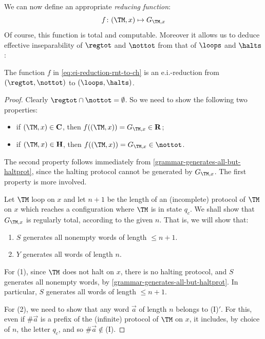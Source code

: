 We can now define an appropriate \emph{reducing function}:
\begin{equation}
\label{eq:ei-reduction-rnt-to-ch}
    f \colon (\TM,x) \mapsto G_{\TM,x}
\end{equation}
Of course, this function is total and computable.
Moreover it allows us to deduce effective inseparability of $\regtot $ and $\nottot$ from that of $\loops$ and $\halts$:



\begin{proposition}
\label{regtot-nottot-reduces-to-loops-halts}
    The function $f$ in \eqref{eq:ei-reduction-rnt-to-ch} is an e.i.-reduction from $(\regtot, \nottot)$ to $(\loops,\halts)$.
\end{proposition}
\begin{proof}
Clearly $\regtot \cap \nottot = \emptyset$. 
So we need to show the following two properties:
\begin{itemize}
\item if $(\TM,x) \in \mathbf{C}$, then $f((\TM,x)) = G_{\TM,x} \in \mathbf{R}$;
\item if $(\TM,x) \in \mathbf{H}$, then $f((\TM,x)) = G_{\TM,x} \in \nottot$.
\end{itemize}

The second property follows immediately from \cref{grammar-generates-all-but-haltprot}, since the halting protocol cannot be generated by $G_{\TM,x}$. The first property is more involved.

Let $\TM$ loop on $x$ and let $n+1$ be the length of an (incomplete) protocol of $\TM$ on $x$ which reaches a configuration where $\TM$ is in state $q_c$. We shall show that $G_{\TM,x}$ is regularly total, according to the given $n$.
That is, we will show that:
\begin{enumerate}
    \item $S$ generates all nonempty words of length $\leq n+1$.
    \item $Y$ generates all words of length $n$.
\end{enumerate}

For (1), since $\TM$ does not halt on $x$, there is no halting protocol, and $S$ generates all nonempty words, by \cref{grammar-generates-all-but-haltprot}. In particular, $S$ generates all words of length $\leq n + 1$.

For (2), we need to show that any word $\vec a$ of length $n$ belongs to (I)$'$.
For this, even if $\# \vec a$ is a prefix of the (infinite) protocol of $\TM$ on $x$, it includes, by choice of $n$, the letter $q_c$, and so $\# \vec a \notin $(I).
% 
% 
%
% 
\end{proof}

